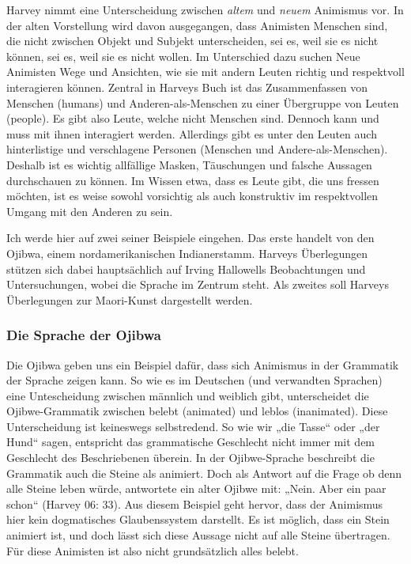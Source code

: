 Harvey nimmt eine Unterscheidung zwischen \emph{altem} und \emph{neuem} Animismus vor. In der alten Vorstellung wird davon ausgegangen, dass Animisten Menschen sind, die nicht zwischen Objekt und Subjekt unterscheiden, sei es, weil sie es nicht können, sei es, weil sie es nicht wollen. Im Unterschied dazu suchen Neue Animisten Wege und Ansichten, wie sie mit andern Leuten richtig und respektvoll interagieren können. Zentral in Harveys Buch ist das Zusammenfassen von Menschen (humans) und Anderen-als-Menschen zu einer Übergruppe von Leuten (people). Es gibt also Leute, welche nicht Menschen sind. Dennoch kann und muss mit ihnen interagiert werden. Allerdings gibt es unter den Leuten auch hinterlistige und verschlagene Personen (Menschen und Andere-als-Menschen). Deshalb ist es wichtig allfällige Masken, Täuschungen und falsche Aussagen durchschauen zu können. Im Wissen etwa, dass es Leute gibt, die uns fressen möchten, ist es weise sowohl vorsichtig als auch konstruktiv im respektvollen Umgang mit den Anderen zu sein. 

Ich werde hier auf zwei seiner Beispiele eingehen. Das erste handelt von den Ojibwa, einem nordamerikanischen Indianerstamm. Harveys Überlegungen stützen sich dabei hauptsächlich auf Irving Hallowells Beobachtungen und Untersuchungen, wobei die Sprache im Zentrum steht. Als zweites soll Harveys Überlegungen zur Maori-Kunst dargestellt werden.

\subsubsection*{Die Sprache der Ojibwa}
Die Ojibwa geben uns ein Beispiel dafür, dass sich Animismus in der Grammatik der Sprache zeigen kann. So wie es im Deutschen (und verwandten Sprachen) eine Untescheidung zwischen männlich und weiblich gibt, unterscheidet die Ojibwe-Grammatik zwischen belebt (animated) und leblos (inanimated). Diese Unterscheidung ist keineswegs selbstredend. So wie wir „die Tasse“ oder „der Hund“ sagen, entspricht das grammatische Geschlecht nicht immer mit dem Geschlecht des Beschriebenen überein. In der Ojibwe-Sprache beschreibt die Grammatik auch die Steine als animiert. Doch als Antwort auf die Frage ob denn alle Steine leben würde, antwortete ein alter Ojibwe mit: „Nein. Aber ein paar schon“ (Harvey 06: 33). Aus diesem Beispiel geht hervor, dass der Animismus hier kein dogmatisches Glaubenssystem darstellt. Es ist möglich, dass ein Stein animiert ist, und doch lässt sich diese Aussage nicht auf alle Steine übertragen. Für diese Animisten ist also nicht grundsätzlich alles belebt. 

